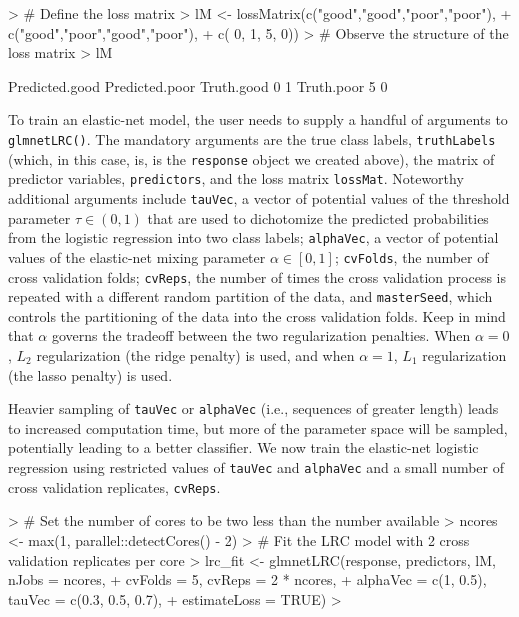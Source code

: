 \documentclass{article}
\begin{document}
\begin{Schunk}
\begin{Sinput}
> # Define the loss matrix
> lM <- lossMatrix(c("good","good","poor","poor"),
+                  c("good","poor","good","poor"),
+                  c(     0,     1,     5,     0))
> # Observe the structure of the loss matrix
> lM
\end{Sinput}
\begin{Soutput}
           Predicted.good Predicted.poor
Truth.good              0              1
Truth.poor              5              0
\end{Soutput}
\end{Schunk}

To train an elastic-net model, the user needs to supply a handful of arguments to {\tt glmnetLRC()}. 
The mandatory arguments are the true class labels, {\tt truthLabels} (which, in this case, is, is the {\tt response} 
object we created above), the matrix of predictor variables, {\tt predictors}, 
and the loss matrix {\tt lossMat}. Noteworthy additional arguments include {\tt tauVec}, a vector of potential values of the 
threshold parameter $\tau \in (0, 1)$ that are used to dichotomize the predicted probabilities from the logistic regression 
into two class labels; {\tt alphaVec}, a vector of potential values of the elastic-net mixing parameter 
$\alpha \in [0, 1]$; {\tt cvFolds}, the number of cross validation folds; {\tt cvReps}, the number of times
the cross validation process is repeated with a different random partition of the data, and {\tt masterSeed}, which controls 
the partitioning of the data into the cross validation folds. Keep in mind that $\alpha$ governs the tradeoff between 
the two regularization penalties. When $\alpha = 0$, $L_2$ regularization (the ridge penalty) is used,
and when $\alpha = 1$, $L_1$ regularization (the lasso penalty) is used.

Heavier sampling of {\tt tauVec} or {\tt alphaVec} (i.e., sequences of greater length) leads to 
increased computation time, but more of the parameter space will be sampled, potentially leading to a better 
classifier.  We now train the elastic-net logistic regression using restricted values of {\tt tauVec} and 
{\tt alphaVec} and a small number of cross validation replicates, {\tt cvReps}.
\begin{Schunk}
\begin{Sinput}
> # Set the number of cores to be two less than the number available
> ncores <- max(1, parallel::detectCores() - 2)
> # Fit the LRC model with 2 cross validation replicates per core
> lrc_fit <- glmnetLRC(response, predictors, lM, nJobs = ncores,
+                      cvFolds = 5, cvReps = 2 * ncores,
+                      alphaVec = c(1, 0.5), tauVec = c(0.3, 0.5, 0.7),
+                      estimateLoss = TRUE)
> 
\end{Sinput}
\end{Schunk}
\end{document}
